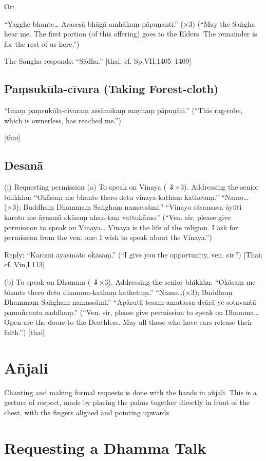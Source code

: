 Or:

“Yagghe bhante…
Avasesā bhāgā amhākaṃ pāpuṇanti.” (×3)
(“May the Saṅgha hear me. The first
portion (of this offering) goes to the Elders.
The remainder is for the rest of us here.”)

The Sangha responds: “Sādhu.”
[thai; cf. Sp,VII,1405–1409]

\section{Paṃsukūla-cīvara (Taking Forest-cloth)}

“Imaṃ paṃsukūla-cīvaraṃ
assāmikaṃ mayhaṃ pāpuṇāti.”
(“This rag-robe, which is ownerless,
has reached me.”)

[thai]

\section{Desanā}

(i) Requesting permission
(a) To speak on Vinaya
( ⇓×3). Addressing the senior bhikkhu:
“Okāsaṃ me bhante thero detu
vinaya-kathaṃ kathetuṃ.”
“Namo…(×3);
Buddhaṃ Dhammaṃ Saṅghaṃ namassāmi.”
“Vinayo sāsanassa āyūti karotu me āyasmā
okāsaṃ ahan-taṃ vattukāmo.”
(“Ven. sir, please give permission to speak on
Vinaya… Vinaya is the life of the religion.
I ask for permission from the ven. one:
I wish to speak about the Vinaya.”)

Reply: “Karomi āyasmato okāsaṃ.”
(“I give you the opportunity, ven. sir.”)
[Thai; cf. Vin,I,113]

(b) To speak on Dhamma
( ⇓×3). Addressing the senior bhikkhu:
“Okāsaṃ me bhante thero detu
dhamma-kathaṃ kathetuṃ.”
“Namo…(×3);
Buddhaṃ Dhammaṃ Saṅghaṃ namassāmi.”
“Apārutā tesaṃ amatassa dvārā
ye sotavantā pamuñcantu saddhaṃ.”
(“Ven. sir, please give permission to speak on
Dhamma… Open are the doors to the Deathless.
May all those who have ears release their faith.”)
[thai]

\chapter{Añjali}

Chanting and making formal requests is done with the hands in añjali.
This is a gesture of respect, made by placing the palms together
directly in front of the chest, with the fingers aligned and pointing
upwards.

\chapter{Requesting a Dhamma Talk}

